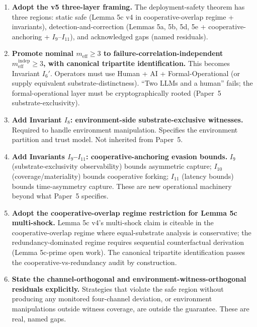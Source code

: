 \documentclass{article}
\newcommand{\meff}{m_{\mathrm{eff}}}
\begin{document}
\begin{enumerate}
\item \textbf{Adopt the v5 three-layer framing.}  The
  deployment-safety theorem has three regions: static safe (Lemma
  5c v4 in cooperative-overlap regime + invariants),
  detection-and-correction (Lemmas 5a, 5b, 5d, 5e + cooperative-
  anchoring + $I_9$--$I_{11}$), and acknowledged gaps (named
  residuals).

\item \textbf{Promote nominal $\meff \geq 3$ to
  failure-correlation-independent $\meff^{\mathrm{indep}} \geq 3$,
  with canonical tripartite identification.}  This becomes
  Invariant $I_6'$.  Operators must use Human + AI +
  Formal-Operational (or supply equivalent substrate-distinctness).
  ``Two LLMs and a human'' fails; the formal-operational layer must
  be cryptographically rooted (Paper~5 substrate-exclusivity).

\item \textbf{Add Invariant $I_8$: environment-side
  substrate-exclusive witnesses.}  Required to handle environment
  manipulation.  Specifies the environment partition and trust
  model.  Not inherited from Paper~5.

\item \textbf{Add Invariants $I_9$--$I_{11}$: cooperative-anchoring
  evasion bounds.}  $I_9$ (substrate-exclusivity observability)
  bounds asymmetric capture; $I_{10}$ (coverage/materiality)
  bounds cooperative forking; $I_{11}$ (latency bounds) bounds
  time-asymmetry capture.  These are new operational machinery
  beyond what Paper~5 specifies.

\item \textbf{Adopt the cooperative-overlap regime restriction for
  Lemma 5c multi-shock.}  Lemma 5c v4's multi-shock claim is
  citeable in the cooperative-overlap regime where equal-substrate
  analysis is conservative; the redundancy-dominated regime
  requires sequential counterfactual derivation (Lemma 5c-prime
  open work).  The canonical tripartite identification passes the
  cooperative-vs-redundancy audit by construction.

\item \textbf{State the channel-orthogonal and
  environment-witness-orthogonal residuals explicitly.}
  Strategies that violate the safe region without producing any
  monitored four-channel deviation, or environment manipulations
  outside witness coverage, are outside the guarantee.  These are
  real, named gaps.


\end{enumerate}
\end{document}
